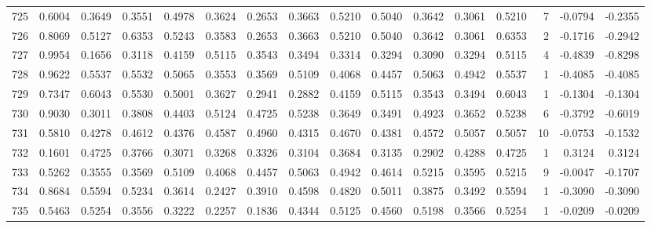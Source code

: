 \begin{tabular}{lrrrrrrrrrrrrrrr}
725 &      0.6004 &  0.3649 &  0.3551 &  0.4978 &  0.3624 &  0.2653 &  0.3663 &  0.5210 &  0.5040 &  0.3642 &   0.3061 &     0.5210 &      7 &                   -0.0794 &                    -0.2355 \\
726 &      0.8069 &  0.5127 &  0.6353 &  0.5243 &  0.3583 &  0.2653 &  0.3663 &  0.5210 &  0.5040 &  0.3642 &   0.3061 &     0.6353 &      2 &                   -0.1716 &                    -0.2942 \\
727 &      0.9954 &  0.1656 &  0.3118 &  0.4159 &  0.5115 &  0.3543 &  0.3494 &  0.3314 &  0.3294 &  0.3090 &   0.3294 &     0.5115 &      4 &                   -0.4839 &                    -0.8298 \\
728 &      0.9622 &  0.5537 &  0.5532 &  0.5065 &  0.3553 &  0.3569 &  0.5109 &  0.4068 &  0.4457 &  0.5063 &   0.4942 &     0.5537 &      1 &                   -0.4085 &                    -0.4085 \\
729 &      0.7347 &  0.6043 &  0.5530 &  0.5001 &  0.3627 &  0.2941 &  0.2882 &  0.4159 &  0.5115 &  0.3543 &   0.3494 &     0.6043 &      1 &                   -0.1304 &                    -0.1304 \\
730 &      0.9030 &  0.3011 &  0.3808 &  0.4403 &  0.5124 &  0.4725 &  0.5238 &  0.3649 &  0.3491 &  0.4923 &   0.3652 &     0.5238 &      6 &                   -0.3792 &                    -0.6019 \\
731 &      0.5810 &  0.4278 &  0.4612 &  0.4376 &  0.4587 &  0.4960 &  0.4315 &  0.4670 &  0.4381 &  0.4572 &   0.5057 &     0.5057 &     10 &                   -0.0753 &                    -0.1532 \\
732 &      0.1601 &  0.4725 &  0.3766 &  0.3071 &  0.3268 &  0.3326 &  0.3104 &  0.3684 &  0.3135 &  0.2902 &   0.4288 &     0.4725 &      1 &                    0.3124 &                     0.3124 \\
733 &      0.5262 &  0.3555 &  0.3569 &  0.5109 &  0.4068 &  0.4457 &  0.5063 &  0.4942 &  0.4614 &  0.5215 &   0.3595 &     0.5215 &      9 &                   -0.0047 &                    -0.1707 \\
734 &      0.8684 &  0.5594 &  0.5234 &  0.3614 &  0.2427 &  0.3910 &  0.4598 &  0.4820 &  0.5011 &  0.3875 &   0.3492 &     0.5594 &      1 &                   -0.3090 &                    -0.3090 \\
735 &      0.5463 &  0.5254 &  0.3556 &  0.3222 &  0.2257 &  0.1836 &  0.4344 &  0.5125 &  0.4560 &  0.5198 &   0.3566 &     0.5254 &      1 &                   -0.0209 &                    -0.0209 \\

\end{tabular}
